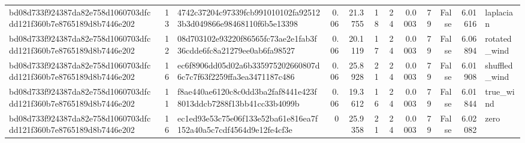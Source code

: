 \begin{tabular}{lrlrrrrrrrrl}
bd08d733f924387da82e758d1060703dfcdd121f360b7e8765189d8b7446e202 & 13 & 4742c37204c97339fcb991010102fa925123b3d049866e98468110f6b5e13398 & 0.06 & 21.3755 & 18 & 24 & 0.0003 & 79 & False & 6.01616 & laplacian \\
bd08d733f924387da82e758d1060703dfcdd121f360b7e8765189d8b7446e202 & 12 & 08d703102e93220f86565fc73ae2e1fab3f36cdde6fc8a21279ee0ab6fa98527 & 0.06 & 20.1119 & 17 & 24 & 0.0003 & 79 & False & 6.06894 & rotated\_wind \\
bd08d733f924387da82e758d1060703dfcdd121f360b7e8765189d8b7446e202 & 16 & ec6f8906dd05d02a6b335975202660807d6c7c7f63f2259ffa3ea3471187c486 & 0.06 & 25.8928 & 21 & 24 & 0.0003 & 79 & False & 6.01908 & shuffled\_wind \\
bd08d733f924387da82e758d1060703dfcdd121f360b7e8765189d8b7446e202 & 11 & f8ae440ae6120c8c0dd3ba2faf8441e423f8013ddcb7288f13bb41cc33b4099b & 0.06 & 19.3612 & 16 & 24 & 0.0003 & 79 & False & 6.01844 & true\_wind \\
bd08d733f924387da82e758d1060703dfcdd121f360b7e8765189d8b7446e202 & 16 & ec1ed93e53c75e06f133e52ba61e816ea7f152a40a5c7cdf4564d9e12fe4cf3e & 0 & 25.9358 & 21 & 24 & 0.0003 & 79 & False & 6.02082 & zero \\
\hline
\end{tabular}
